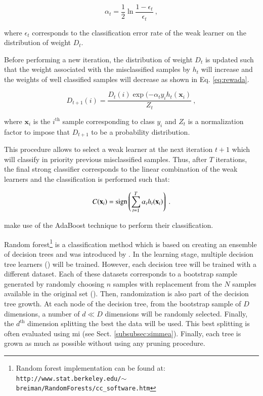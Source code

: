 \begin{enumerate}[leftmargin=*]
\begin{equation}
	\alpha_t = \frac{1}{2} \ln \frac{1 - \epsilon_t}{\epsilon_t} \ ,
	\label{eq:wclssada}
\end{equation}

\noindent where $\epsilon_t$ corresponds to the classification error rate of the weak learner on the distribution of weight $D_t$.

Before performing a new iteration, the distribution of weight $D_t$ is updated such that the weight associated with the misclassified samples by $h_t$ will increase and the weights of well classified samples will decrease as shown in Eq. \eqref{eq:rewada}.

\begin{equation}
	D_{t+1}(i) = \frac{ D_t(i) \exp(-\alpha_t y_i h_{t}(\mathbf{x}_{i} ) }{ Z_t  } \ ,
	\label{eq:rewada} 
\end{equation}

\noindent where $\mathbf{x}_i$ is the $i^{\text{th}}$ sample corresponding to class $y_i$ and $Z_t$ is a normalization factor to impose that $D_{t+1}$ to be a probability distribution. 

This procedure allows to select a weak learner at the next iteration $t+1$ which will classify in priority previous misclassified samples. Thus, after $T$ iterations, the final strong classifier corresponds to the linear combination of the weak learners and the classification is performed such that:

\begin{equation}
	C(\mathbf{x}_i) = \operatorname*{sign} \left( \sum_{t=1}^{T} \alpha_t h_t(\mathbf{x}_i) \right) \ .
	\label{eq:strclaada}
\end{equation}

\cite{Lopes2011} make use of the AdaBoost technique to perform their classification.

Random forest\footnote{Random forest implementation can be found at: \texttt{http://www.stat.berkeley.edu/\allowbreak $\sim$breiman/RandomForests/cc\_software.htm}} is a classification method which is based on creating an ensemble of decision trees and was introduced by \cite{Breiman2001}. In the learning stage, multiple decision tree learners (\cite{Breiman1984}) will be trained. However, each decision tree will be trained with a different dataset. Each of these datasets corresponds to a bootstrap sample generated by randomly choosing $n$ samples with replacement from the $N$ samples available in the original set (\cite{Efron1979}). Then, randomization is also part of the decision tree growth. At each node of the decision tree, from the bootstrap sample of $D$ dimensions, a number of $d \ll D$ dimensions will be randomly selected. Finally, the $d^{\text{th}}$ dimension splitting the best the data will be used. This best splitting is often evaluated using \ac{mi} (see Sect. \ref{subsubsec:simmea}). Finally, each tree is grown as much as possible without using any pruning procedure.


\end{enumerate}
